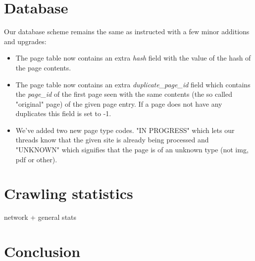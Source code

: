 \documentclass[runningheads]{llncs}
\begin{document}
\section{Database}
Our database scheme remains the same as instructed with a few minor additions and upgrades:
\begin{itemize}
\item The page table now contains an extra \textit{hash} field with the value of the hash of the page contents.
\item The page table now contains an extra \textit{duplicate\_page\_id} field which contains the \textit{page\_id} of the first page seen with the same contents (the so called "original" page) of the given page entry. If a page does not have any duplicates this field is set to -1.
\item We've added two new page type codes. "IN PROGRESS" which lets our threads know that the given site is already being processed and "UNKNOWN" which signifies that the page is of an unknown type (not img, pdf or other).

\end{itemize}
\section{Crawling statistics}
network + general stats
\section{Conclusion}

 
 
 
\end{document}
